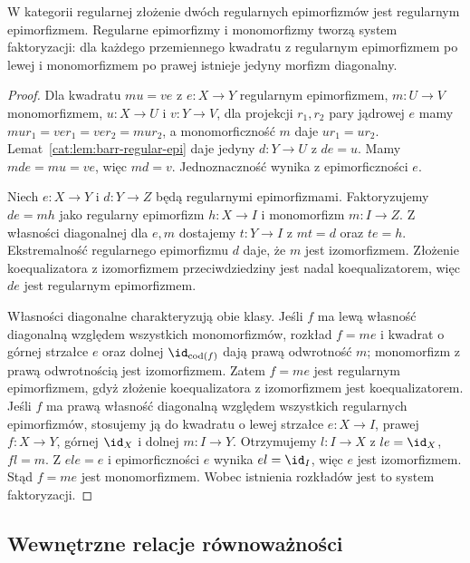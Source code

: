 \begin{stwierdzenie}\label{cat:prop:barr-regular-epi-comp}
W kategorii regularnej złożenie dwóch regularnych epimorfizmów jest regularnym epimorfizmem. Regularne epimorfizmy i monomorfizmy tworzą system faktoryzacji: dla każdego przemiennego kwadratu z regularnym epimorfizmem po lewej i monomorfizmem po prawej istnieje jedyny morfizm diagonalny.
\end{stwierdzenie}
\begin{proof}
Dla kwadratu $mu=ve$ z $e:X\to Y$ regularnym epimorfizmem, $m:U\to V$ monomorfizmem, $u:X\to U$ i $v:Y\to V$, dla projekcji $r_1,r_2$ pary jądrowej $e$ mamy $mur_1=ver_1=ver_2=mur_2$, a monomorficzność $m$ daje $ur_1=ur_2$. Lemat~\ref{cat:lem:barr-regular-epi} daje jedyny $d:Y\to U$ z $de=u$. Mamy $mde=mu=ve$, więc $md=v$. Jednoznaczność wynika z epimorficzności $e$.

Niech $e:X\to Y$ i $d:Y\to Z$ będą regularnymi epimorfizmami. Faktoryzujemy $de=mh$ jako regularny epimorfizm $h:X\to I$ i monomorfizm $m:I\to Z$. Z własności diagonalnej dla $e,m$ dostajemy $t:Y\to I$ z $mt=d$ oraz $te=h$. Ekstremalność regularnego epimorfizmu $d$ daje, że $m$ jest izomorfizmem. Złożenie koequalizatora z izomorfizmem przeciwdziedziny jest nadal koequalizatorem, więc $de$ jest regularnym epimorfizmem.

Własności diagonalne charakteryzują obie klasy. Jeśli $f$ ma lewą własność diagonalną względem wszystkich monomorfizmów, rozkład $f=me$ i kwadrat o górnej strzałce $e$ oraz dolnej $\id_{\operatorname{cod}(f)}$ dają prawą odwrotność $m$; monomorfizm z prawą odwrotnością jest izomorfizmem. Zatem $f=me$ jest regularnym epimorfizmem, gdyż złożenie koequalizatora z izomorfizmem jest koequalizatorem. Jeśli $f$ ma prawą własność diagonalną względem wszystkich regularnych epimorfizmów, stosujemy ją do kwadratu o lewej strzałce $e:X\to I$, prawej $f:X\to Y$, górnej $\id_X$ i dolnej $m:I\to Y$. Otrzymujemy $l:I\to X$ z $le=\id_X$, $fl=m$. Z $ele=e$ i epimorficzności $e$ wynika $el=\id_I$, więc $e$ jest izomorfizmem. Stąd $f=me$ jest monomorfizmem. Wobec istnienia rozkładów jest to system faktoryzacji.
\end{proof}

\subsection{Wewnętrzne relacje równoważności}

